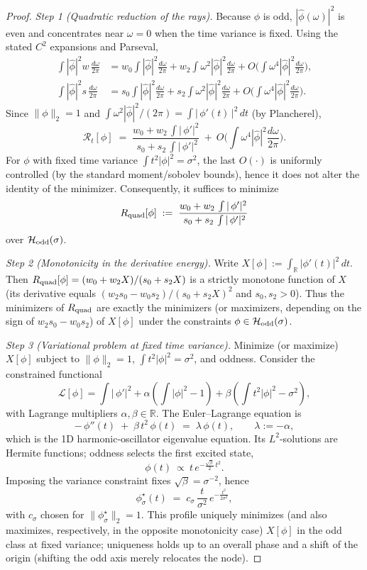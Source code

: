 \documentclass[10pt]{article}
\theoremstyle{definition}
\theoremstyle{plain}
\begin{document}
\begin{proof}
\textit{Step 1 (Quadratic reduction of the rays).}
Because $\phi$ is odd, $|\widehat\phi(\omega)|^2$ is even and concentrates near $\omega=0$ when the time variance is fixed.
Using the stated $C^2$ expansions and Parseval,
\[
\begin{aligned}
\int |\widehat\phi|^2 w\,\frac{d\omega}{2\pi}
&= w_0\!\int |\widehat\phi|^2\frac{d\omega}{2\pi} + w_2\!\int \omega^2|\widehat\phi|^2\frac{d\omega}{2\pi} + O\!\Big(\!\int \omega^4|\widehat\phi|^2\frac{d\omega}{2\pi}\!\Big),\\
\int |\widehat\phi|^2 s\,\frac{d\omega}{2\pi}
&= s_0\!\int |\widehat\phi|^2\frac{d\omega}{2\pi} + s_2\!\int \omega^2|\widehat\phi|^2\frac{d\omega}{2\pi} + O\!\Big(\!\int \omega^4|\widehat\phi|^2\frac{d\omega}{2\pi}\!\Big).
\end{aligned}
\]
Since $\|\phi\|_2=1$ and $\int \omega^2|\widehat\phi|^2/(2\pi)=\int |\,\phi'(t)\,|^2\,dt$ (by Plancherel),
\[
\mathcal R_t[\phi]\;=\;\frac{w_0 + w_2\,\int |\,\phi'|^2}{\;s_0 + s_2\,\int |\,\phi'|^2}\ +\ O\!\Big(\int \omega^4|\widehat\phi|^2\frac{d\omega}{2\pi}\Big).
\]
For $\phi$ with fixed time variance $\int t^2|\phi|^2=\sigma^2$, the last $O(\cdot)$ is uniformly controlled (by the standard moment/sobolev bounds), hence it does not alter the identity of the minimizer. Consequently, it suffices to minimize
\[
R_{\rm quad}[\phi]\;:=\;\frac{w_0 + w_2\,\int |\,\phi'|^2}{\;s_0 + s_2\,\int |\,\phi'|^2}
\]
over $\mathcal H_{\rm odd}(\sigma)$.

\medskip
\textit{Step 2 (Monotonicity in the derivative energy).}
Write $X[\phi]:=\int_{\mathbb R}|\phi'(t)|^2\,dt$. Then $R_{\rm quad}[\phi]=(w_0+w_2 X)/(s_0+s_2 X)$ is a strictly monotone function of $X$ (its derivative equals $(w_2 s_0 - w_0 s_2)/(s_0+s_2 X)^2$ and $s_0,s_2>0$). Thus the minimizers of $R_{\rm quad}$ are exactly the minimizers (or maximizers, depending on the sign of $w_2 s_0 - w_0 s_2$) of $X[\phi]$ under the constraints $\phi\in\mathcal H_{\rm odd}(\sigma)$.

\medskip
\textit{Step 3 (Variational problem at fixed time variance).}
Minimize (or maximize) $X[\phi]$ subject to $\|\phi\|_2=1$, $\int t^2|\phi|^2=\sigma^2$, and oddness. Consider the constrained functional
\[
\mathcal L[\phi]=\int |\,\phi'|^2 + \alpha\!\left(\int |\phi|^2 - 1\right)
+ \beta\!\left(\int t^2|\phi|^2 - \sigma^2\right),
\]
with Lagrange multipliers $\alpha,\beta\in\mathbb R$. The Euler–Lagrange equation is
\[
-\,\phi''(t)\;+\;\beta\,t^2\,\phi(t)\;=\;\lambda\,\phi(t),\qquad \lambda:=-\alpha,
\]
which is the 1D harmonic-oscillator eigenvalue equation. Its $L^2$-solutions are Hermite functions; oddness selects the first excited state,
\[
\phi(t)\ \propto\ t\,e^{-\frac{\sqrt{\beta}}{2}\,t^2}.
\]
Imposing the variance constraint fixes $\sqrt{\beta}=\sigma^{-2}$, hence
\[
\phi^\star_\sigma(t)\;=\;c_\sigma\,\frac{t}{\sigma^2}\,e^{-\frac{t^2}{2\sigma^2}},
\]
with $c_\sigma$ chosen for $\|\phi^\star_\sigma\|_2=1$. This profile uniquely minimizes (and also maximizes, respectively, in the opposite monotonicity case) $X[\phi]$ in the odd class at fixed variance; uniqueness holds up to an overall phase and a shift of the origin (shifting the odd axis merely relocates the node).


\end{proof}
\end{document}
